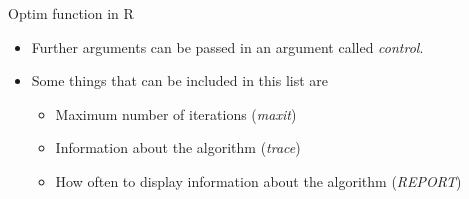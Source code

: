 \documentclass[10pt]{beamer}
\begin{document}
                                                                                              \begin{frame}{Optim function in R}
                                                                                                \begin{itemize}
                                                                                                \item Further arguments can be passed in an argument called {\em control}.
                                                                                                \item Some things that can be included in this list are
                                                                                                  \begin{itemize}
                                                                                                  \item Maximum number of iterations ({\em maxit})
                                                                                                  \item Information about the algorithm ({\em trace})
                                                                                                  \item How often to display information about the algorithm ({\em REPORT})
                                                                                                  \end{itemize}
                                                                                                \end{itemize}
                                                                                              \end{frame}
\end{document}
